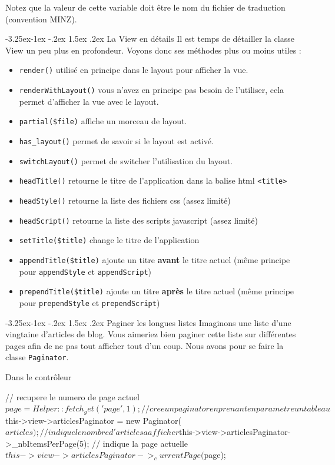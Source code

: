 \documentclass[a4paper,11pt]{article}
\makeatletter
\renewcommand{\subsection}{\@startsection{subsection}{2}{\z@}%
             {-3.25ex\@plus -1ex \@minus -.2ex}%
             {1.5ex \@plus .2ex}%
             {\color{bleuFonce}\normalfont\large\bfseries}}
\makeatother
\begin{document}
Notez que la valeur de cette variable doit être le nom du fichier de traduction (convention MINZ).

\subsection{La View en détails}
Il est temps de détailler la classe View un peu plus en profondeur. Voyons donc ses méthodes plus ou moins utiles :
\begin{itemize}
  \item \texttt{render()} utilisé en principe dans le layout pour afficher la vue.
  \item \texttt{renderWithLayout()} vous n'avez en principe pas besoin de l'utiliser, cela permet d'afficher la vue avec le layout.
  \item \texttt{partial(\$file)} affiche un morceau de layout.
  \item \texttt{has\_layout()} permet de savoir si le layout est activé.
  \item \texttt{switchLayout()} permet de switcher l'utilisation du layout.
  \item \texttt{headTitle()} retourne le titre de l'application dans la balise html \texttt{<title>}
  \item \texttt{headStyle()} retourne la liste des fichiers css (assez limité)
  \item \texttt{headScript()} retourne la liste des scripts javascript (assez limité)
  \item \texttt{setTitle(\$title)} change le titre de l'application
  \item \texttt{appendTitle(\$title)} ajoute un titre \textbf{avant} le titre actuel (même principe pour \texttt{appendStyle} et \texttt{appendScript})
  \item \texttt{prependTitle(\$title)} ajoute un titre \textbf{après} le titre actuel (même principe pour \texttt{prependStyle} et \texttt{prependScript})
\end{itemize}

\subsection{Paginer les longues listes}
Imaginons une liste d'une vingtaine d'articles de blog. Vous aimeriez bien paginer cette liste sur différentes pages afin de ne pas tout afficher tout d'un coup. Nous avons pour se faire la classe \texttt{Paginator}.

Dans le contrôleur
\begin{PHP}
// recupere le numero de page actuel
$page = Helper::fetch_get('page', 1);
// cree un paginator en prenant en parametre un tableau
$this->view->articlesPaginator = new Paginator($articles);
// indique le nombre d'articles a afficher
$this->view->articlesPaginator->_nbItemsPerPage(5);
// indique la page actuelle
$this->view->articlesPaginator->_currentPage($page);
\end{PHP}
\end{document}
